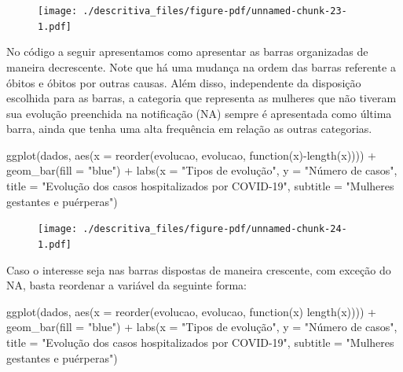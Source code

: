 \documentclass[
  letterpaper,
  DIV=11,
  numbers=noendperiod]{scrreprt}
\newenvironment{Shaded}{\begin{snugshade}}{\end{snugshade}}
\newcommand{\AttributeTok}[1]{\textcolor[rgb]{0.40,0.45,0.13}{#1}}
\newcommand{\ControlFlowTok}[1]{\textcolor[rgb]{0.00,0.23,0.31}{#1}}
\newcommand{\FunctionTok}[1]{\textcolor[rgb]{0.28,0.35,0.67}{#1}}
\newcommand{\NormalTok}[1]{\textcolor[rgb]{0.00,0.23,0.31}{#1}}
\newcommand{\SpecialCharTok}[1]{\textcolor[rgb]{0.37,0.37,0.37}{#1}}
\newcommand{\StringTok}[1]{\textcolor[rgb]{0.13,0.47,0.30}{#1}}
\begin{document}
\begin{figure}[H]

{\centering \texttt{[image: ./descritiva\_files/figure-pdf/unnamed-chunk-23-1.pdf]}

}

\end{figure}

No código a seguir apresentamos como apresentar as barras organizadas de
maneira decrescente. Note que há uma mudança na ordem das barras
referente a óbitos e óbitos por outras causas. Além disso, independente
da disposição escolhida para as barras, a categoria que representa as
mulheres que não tiveram sua evolução preenchida na notificação (NA)
sempre é apresentada como última barra, ainda que tenha uma alta
frequência em relação as outras categorias.

\begin{Shaded}
\begin{Highlighting}[]
\FunctionTok{ggplot}\NormalTok{(dados, }\FunctionTok{aes}\NormalTok{(}\AttributeTok{x =} \FunctionTok{reorder}\NormalTok{(evolucao, evolucao, }\ControlFlowTok{function}\NormalTok{(x)}\SpecialCharTok{{-}}\FunctionTok{length}\NormalTok{(x)))) }\SpecialCharTok{+}
  \FunctionTok{geom\_bar}\NormalTok{(}\AttributeTok{fill =} \StringTok{"blue"}\NormalTok{) }\SpecialCharTok{+}
  \FunctionTok{labs}\NormalTok{(}\AttributeTok{x =} \StringTok{"Tipos de evolução"}\NormalTok{, }\AttributeTok{y =} \StringTok{"Número de casos"}\NormalTok{, }\AttributeTok{title =} \StringTok{"Evolução dos casos hospitalizados por COVID{-}19"}\NormalTok{, }\AttributeTok{subtitle =} \StringTok{"Mulheres gestantes e puérperas"}\NormalTok{)}
\end{Highlighting}
\end{Shaded}

\begin{figure}[H]

{\centering \texttt{[image: ./descritiva\_files/figure-pdf/unnamed-chunk-24-1.pdf]}

}

\end{figure}

Caso o interesse seja nas barras dispostas de maneira crescente, com
exceção do NA, basta reordenar a variável da seguinte forma:

\begin{Shaded}
\begin{Highlighting}[]
\FunctionTok{ggplot}\NormalTok{(dados, }\FunctionTok{aes}\NormalTok{(}\AttributeTok{x =} \FunctionTok{reorder}\NormalTok{(evolucao, evolucao, }\ControlFlowTok{function}\NormalTok{(x) }\FunctionTok{length}\NormalTok{(x)))) }\SpecialCharTok{+}
  \FunctionTok{geom\_bar}\NormalTok{(}\AttributeTok{fill =} \StringTok{"blue"}\NormalTok{) }\SpecialCharTok{+}
  \FunctionTok{labs}\NormalTok{(}\AttributeTok{x =} \StringTok{"Tipos de evolução"}\NormalTok{, }\AttributeTok{y =} \StringTok{"Número de casos"}\NormalTok{, }\AttributeTok{title =} \StringTok{"Evolução dos casos hospitalizados por COVID{-}19"}\NormalTok{, }\AttributeTok{subtitle =} \StringTok{"Mulheres gestantes e puérperas"}\NormalTok{)}
\end{Highlighting}
\end{Shaded}
\end{document}
